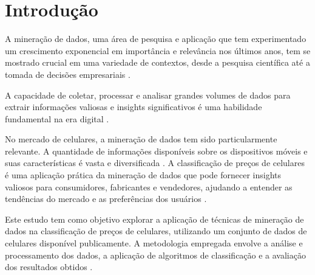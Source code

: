 \documentclass[conference]{IEEEtran}
\begin{document}










\section{Introdução}

A mineração de dados, uma área de pesquisa e aplicação que tem experimentado 
um crescimento exponencial em importância e relevância nos últimos anos, 
tem se mostrado crucial em uma variedade de contextos, 
desde a pesquisa científica até a tomada de decisões 
empresariais \cite{WikipediaDataMining}. 

A capacidade de coletar, processar e analisar grandes volumes de dados para extrair 
informações valiosas e insights significativos é uma habilidade fundamental 
na era digital \cite{Zaki2023}.

No mercado de celulares, a mineração de dados tem sido particularmente relevante. 
A quantidade de informações disponíveis sobre os dispositivos móveis e suas 
características é vasta e diversificada \cite{Statista2023}. 
A classificação de preços de celulares é uma aplicação prática da 
mineração de dados que pode fornecer insights valiosos para consumidores, 
fabricantes e vendedores, ajudando a entender as tendências do mercado e 
as preferências dos usuários \cite{Russell2016}.

Este estudo tem como objetivo explorar a aplicação de técnicas de mineração de dados 
na classificação de preços de celulares, utilizando um 
conjunto de dados de celulares disponível publicamente. 
A metodologia empregada envolve a análise e processamento dos dados, 
a aplicação de algoritmos de classificação e a 
avaliação dos resultados obtidos \cite{ScikitLearn2023}. 
\end{document}
